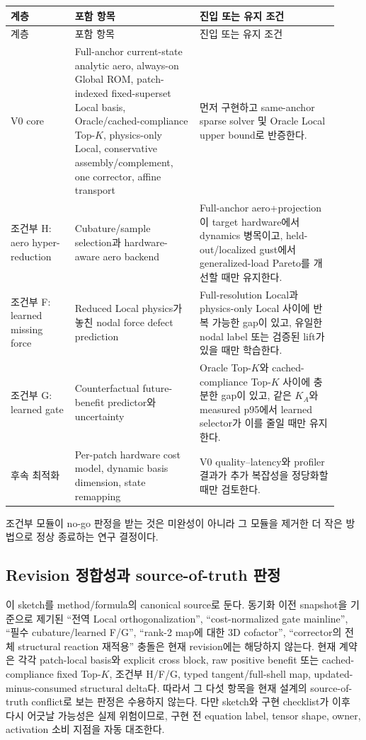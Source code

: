 \documentclass[11pt,a4paper]{article}
\begin{document}
\begin{longtable}{L{0.18\linewidth}L{0.35\linewidth}L{0.39\linewidth}}
\toprule
계층 & 포함 항목 & 진입 또는 유지 조건 \\
\midrule
\endfirsthead
\toprule
계층 & 포함 항목 & 진입 또는 유지 조건 \\
\midrule
\endhead
V0 core
& Full-anchor current-state analytic aero, always-on Global ROM,
patch-indexed fixed-superset Local basis, Oracle/cached-compliance Top-\(K\),
physics-only Local, conservative assembly/complement, one corrector, affine transport
& 먼저 구현하고 same-anchor sparse solver 및 Oracle Local upper bound로 반증한다. \\
\addlinespace
조건부 H: aero hyper-reduction
& Cubature/sample selection과 hardware-aware aero backend
& Full-anchor aero+projection이 target hardware에서 dynamics 병목이고,
held-out/localized gust에서 generalized-load Pareto를 개선할 때만 유지한다. \\
\addlinespace
조건부 F: learned missing force
& Reduced Local physics가 놓친 nodal force defect prediction
& Full-resolution Local과 physics-only Local 사이에 반복 가능한 gap이 있고,
유일한 nodal label 또는 검증된 lift가 있을 때만 학습한다. \\
\addlinespace
조건부 G: learned gate
& Counterfactual future-benefit predictor와 uncertainty
& Oracle Top-\(K\)와 cached-compliance Top-\(K\) 사이에 충분한 gap이 있고,
같은 \(K_A\)와 measured p95에서 learned selector가 이를 줄일 때만 유지한다. \\
\addlinespace
후속 최적화
& Per-patch hardware cost model, dynamic basis dimension, state remapping
& V0 quality--latency와 profiler 결과가 추가 복잡성을 정당화할 때만 검토한다. \\
\bottomrule
\end{longtable}

조건부 모듈이 no-go 판정을 받는 것은 미완성이 아니라
그 모듈을 제거한 더 작은 방법으로 정상 종료하는 연구 결정이다.

\subsection{Revision 정합성과 source-of-truth 판정}

이 sketch를 method/formula의 canonical source로 둔다.
동기화 이전 snapshot을 기준으로 제기된
``전역 Local orthogonalization'', ``cost-normalized gate mainline'',
``필수 cubature/learned F/G'', ``rank-2 map에 대한 3D cofactor'',
``corrector의 전체 structural reaction 재적용'' 충돌은 현재 revision에는 해당하지 않는다.
현재 계약은 각각 patch-local basis와 explicit cross block,
raw positive benefit 또는 cached-compliance fixed Top-\(K\),
조건부 H/F/G, typed tangent/full-shell map,
updated-minus-consumed structural delta다.
따라서 그 다섯 항목을 현재 설계의 source-of-truth conflict로 보는 판정은 수용하지 않는다.
다만 sketch와 구현 checklist가 이후 다시 어긋날 가능성은 실제 위험이므로,
구현 전 equation label, tensor shape, owner, activation 소비 지점을 자동 대조한다.
\end{document}
